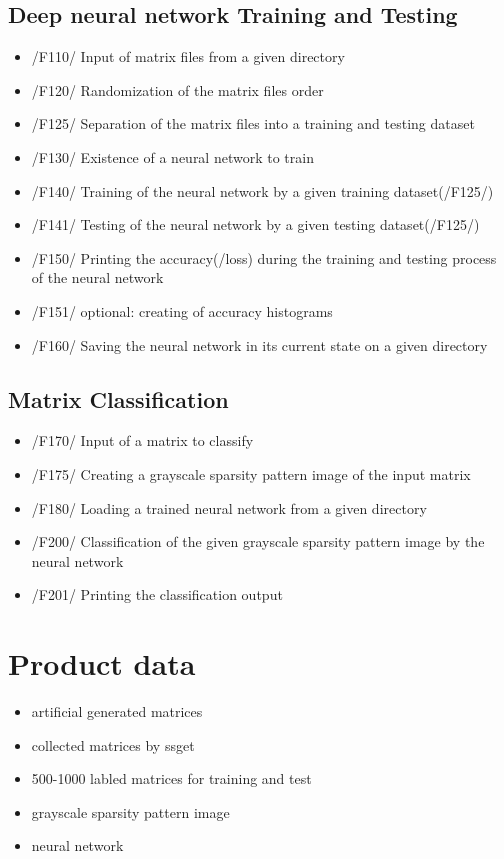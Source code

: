 \documentclass[parskip=full]{scrartcl}
\begin{document}
\subsection{Deep \gls{neural network} Training and Testing}
	\begin{itemize}
	\item /F110/ Input of matrix files from a given directory
	\item /F120/ Randomization of the matrix files order
	\item /F125/ Separation of the matrix files into a training and testing dataset
	\item /F130/ Existence of a \gls{neural network} to train
	\item /F140/ Training of the \gls{neural network} by a given training dataset(/F125/)
	\item /F141/ Testing of the \gls{neural network} by a given testing dataset(/F125/)
	\item /F150/ Printing the accuracy(/loss) during the training and testing process of the \gls{neural network}
	\item /F151/ optional: creating of accuracy histograms
	\item /F160/ Saving the \gls{neural network} in its current state on a given directory
	\end{itemize}
 	
\subsection{Matrix Classification}
	\begin{itemize}
	\item /F170/ Input of a matrix to classify
	\item /F175/ Creating a \gls{grayscale sparsity pattern image} of the input matrix
	\item /F180/ Loading a trained \gls{neural network} from a given directory
	\item /F200/ Classification of the given \gls{grayscale sparsity pattern image} by the \gls{neural network}
	\item /F201/ Printing the classification output
	\end{itemize}

\section{Product data}
	\begin{itemize}
	\item artificial generated matrices
	\item collected matrices by \gls{ssget}
	\item 500-1000 labled matrices for training and test
	\item \gls{grayscale sparsity pattern image}
	\item \gls{neural network}

	\end{itemize}
\end{document}
